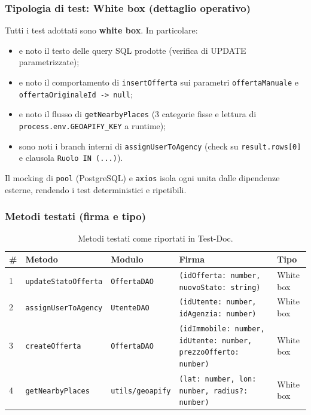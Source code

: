 \documentclass[a4paper,11pt]{article}
\begin{document}
\subsubsection{Tipologia di test: White box (dettaglio operativo)}
Tutti i test adottati sono \textbf{white box}. In particolare:
\begin{itemize}
  \item e noto il testo delle query SQL prodotte (verifica di UPDATE parametrizzate);
  \item e noto il comportamento di \texttt{insertOfferta} sui parametri \texttt{offertaManuale} e \texttt{offertaOriginaleId -> null};
  \item e noto il flusso di \texttt{getNearbyPlaces} (3 categorie fisse e lettura di \texttt{process.env.GEOAPIFY\_KEY} a runtime);
  \item sono noti i branch interni di \texttt{assignUserToAgency} (check su \texttt{result.rows[0]} e clausola \texttt{Ruolo IN (...)}).
\end{itemize}

Il mocking di \texttt{pool} (PostgreSQL) e \texttt{axios} isola ogni unita dalle dipendenze esterne, rendendo i test deterministici e ripetibili.

\subsubsection{Metodi testati (firma e tipo)}
\begin{table}[H]
\centering
\small
\begin{tabular}{@{}p{}p{}p{}p{}p{}@{}}
\toprule
\# & Metodo & Modulo & Firma & Tipo \\
\midrule
1 & \texttt{updateStatoOfferta} & \texttt{OffertaDAO} & \texttt{(idOfferta: number, nuovoStato: string)} & White box \\
2 & \texttt{assignUserToAgency} & \texttt{UtenteDAO} & \texttt{(idUtente: number, idAgenzia: number)} & White box \\
3 & \texttt{createOfferta} & \texttt{OffertaDAO} & \texttt{(idImmobile: number, idUtente: number, prezzoOfferto: number)} & White box \\
4 & \texttt{getNearbyPlaces} & \texttt{utils/geoapify} & \texttt{(lat: number, lon: number, radius?: number)} & White box \\
\bottomrule
\end{tabular}
\caption{Metodi testati come riportati in Test-Doc.}
\label{tab:testdoc-metodi}
\end{table}
\end{document}
